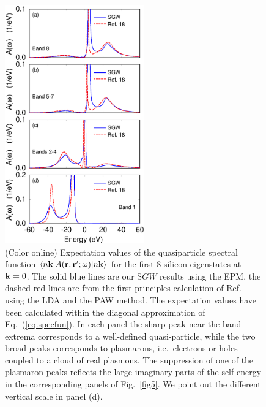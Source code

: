 \documentclass[twocolumn,prb,showpacs,superscriptaddress]{revtex4}
\def\w{\omega}
\def\k{{\bf k}}
\def\r{{\bf r}}
\def\rp{{\bf r^\prime}}
\begin{document}
\begin  {figure}
\begin  {center}
\includegraphics[width=6cm]{fig6.eps}
\end    {center}
\caption{\label{fig6}
        (Color online)
        Expectation values of the quasiparticle spectral function $\langle n\k| A(\r,\rp;\w)|n\k\rangle$
        for the first 8 silicon eigenstates at $\k=0$.
        The solid blue lines are our S$GW$ results using the EPM, the dashed red lines are from the first-principles
        calculation of Ref.\  using the LDA and the PAW method.
        The expectation values have been calculated within the diagonal approximation of Eq.\ (\ref{eq.specfun}).
        In each panel the sharp peak near the band extrema corresponds to a well-defined quasi-particle, while the two broad peaks
        corresponds to plasmarons, i.e.\ electrons or holes coupled to a cloud of real plasmons.\cite{hl}
        The suppression of one of the plasmaron peaks reflects the large imaginary parts of the self-energy in the
        corresponding panels of Fig.\ \ref{fig5}. We point out the different vertical scale in panel (d).
        }
\end    {figure}
\end{document}
